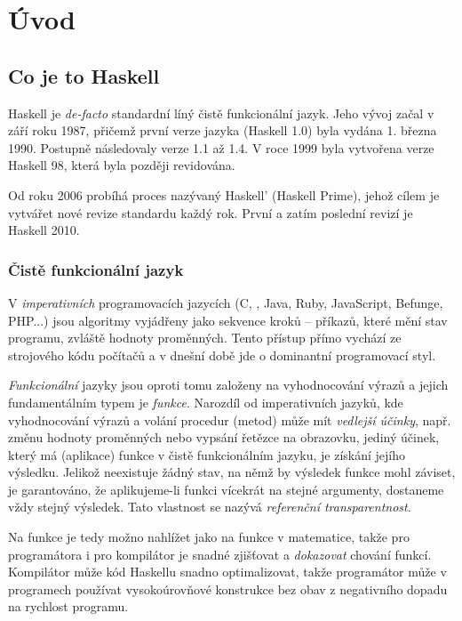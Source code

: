 \chapter{Úvod}

\section{Co je to Haskell}

Haskell je \textit{de-facto} standardní líný čistě funkcionální jazyk. Jeho
vývoj začal v září roku 1987, přičemž první verze jazyka (Haskell 1.0) byla
vydána 1. března 1990. Postupně následovaly verze 1.1 až 1.4. V roce 1999 byla
vytvořena  verze Haskell 98, která
byla později revidována.


Od roku 2006 probíhá proces nazývaný Haskell' (Haskell Prime), jehož cílem je
vytvářet nové revize standardu každý rok. První a zatím poslední revizí je
Haskell 2010.


\subsection{Čistě funkcionální jazyk}

V \emph{imperativních} programovacích jazycích (C, \Cplusplus{}, Java, Ruby,
JavaScript, Befunge, PHP...) jsou algoritmy vyjádřeny jako sekvence kroků --
příkazů, které mění stav programu, zvláště hodnoty proměnných.  Tento přístup
přímo vychází ze strojového kódu počítačů a v dnešní době jde o dominantní
programovací styl.

\emph{Funkcionální} jazyky jsou oproti tomu založeny na vyhodnocování výrazů a
jejich fundamentálním typem je \emph{funkce}. Narozdíl od imperativních jazyků,
kde vyhodnocování výrazů a volání procedur (metod) může mít \emph{vedlejší
účinky}, např. změnu hodnoty proměnných nebo vypsání řetězce na obrazovku,
jediný účinek, který má  (aplikace) funkce v čistě funkcionálním
jazyku, je získání jejího výsledku. Jelikož neexistuje žádný stav, na němž by
výsledek funkce mohl záviset, je garantováno, že aplikujeme-li funkci vícekrát
na stejné argumenty, dostaneme vždy stejný výsledek. Tato vlastnost se nazývá
\emph{referenční transparentnost}.

Na funkce je tedy možno nahlížet jako na funkce v matematice, takže pro
programátora i pro kompilátor je snadné zjišťovat a \emph{dokazovat} chování
funkcí. Kompilátor může kód Haskellu snadno optimalizovat, takže programátor
může v programech používat vysokoúrovňové konstrukce bez obav z negativního
dopadu na rychlost programu.

